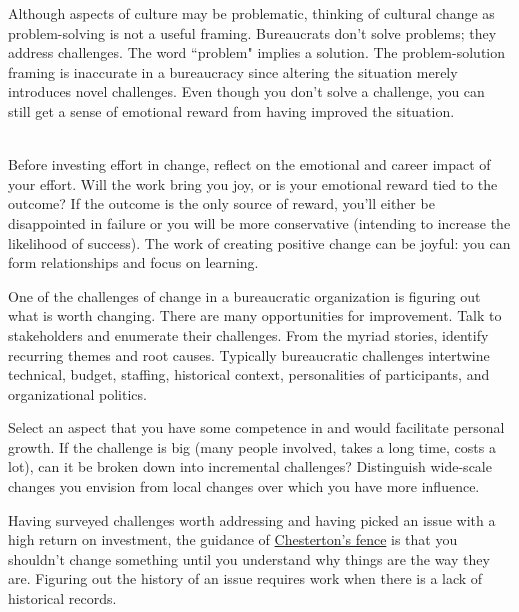 Although aspects of culture may be problematic, thinking of cultural change as problem-solving is not a useful framing. Bureaucrats don't solve problems; they address challenges. The word ``problem" implies a solution. The problem-solution framing is inaccurate in a bureaucracy since altering the situation merely introduces novel challenges. 
Even though you don't solve a challenge, you can still get a sense of emotional reward from having improved the situation. 

\ \\

Before investing effort in change, reflect on the emotional and career impact of your effort. Will the work bring you joy, or is your emotional reward tied to the outcome? If the outcome is the only source of reward, you'll either be disappointed in failure or you will be more conservative (intending to increase the likelihood of success). The work of creating positive change can be joyful: you can form relationships and focus on learning. 

One of the challenges of change in a bureaucratic organization is figuring out what is worth changing. There are many opportunities for improvement. Talk to stakeholders and enumerate their challenges.
%
%
From the myriad stories, identify recurring themes and root causes. Typically bureaucratic challenges intertwine technical, budget, staffing, historical context, personalities of participants, and organizational politics. 

Select an aspect that you have some competence in and would facilitate personal growth. If the challenge is big (many people involved, takes a long time, costs a lot), can it be broken down into incremental challenges? Distinguish wide-scale changes you envision from local changes over which you have more influence.

Having surveyed challenges worth addressing and having picked an issue with a high return on investment, the guidance of
\href{https://en.wikipedia.org/wiki/G._K._Chesterton\%23Chesterton\%27s_fence}{Chesterton's fence}
%
%
%
\iftoggle{haspagenumbers}{(page~\pageref{concept:chestertons_fence})}{section~\ref{concept:chestertons_fence}} 
is that you shouldn't change something until you understand why things are the way they are. Figuring out the history of an issue requires work when there is a lack of historical records.

